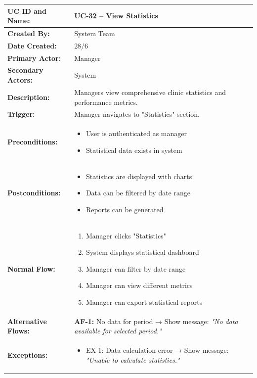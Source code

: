 \documentclass[12pt,a4paper]{article}
\begin{document}
\renewcommand{\arraystretch}{1.5}
\begin{longtable}{|p{4.5cm}|p{10.5cm}|}
\hline
\textbf{UC ID and Name:} & UC-32 – View Statistics \\
\hline
\textbf{Created By:} & System Team \\
\hline
\textbf{Date Created:} & 28/6 \\
\hline
\textbf{Primary Actor:} & Manager \\
\hline
\textbf{Secondary Actors:} & System \\
\hline
\textbf{Description:} & Managers view comprehensive clinic statistics and performance metrics. \\
\hline
\textbf{Trigger:} & Manager navigates to "Statistics" section. \\
\hline
\textbf{Preconditions:} &
\begin{itemize}
  \item User is authenticated as manager
  \item Statistical data exists in system
\end{itemize} \\
\hline
\textbf{Postconditions:} &
\begin{itemize}
  \item Statistics are displayed with charts
  \item Data can be filtered by date range
  \item Reports can be generated
\end{itemize} \\
\hline
\textbf{Normal Flow:} &
\begin{enumerate}
  \item Manager clicks "Statistics"
  \item System displays statistical dashboard
  \item Manager can filter by date range
  \item Manager can view different metrics
  \item Manager can export statistical reports
\end{enumerate} \\
\hline
\textbf{Alternative Flows:} &
\textbf{AF-1:} No data for period → Show message: \textit{"No data available for selected period."} \\
\hline
\textbf{Exceptions:} &
\begin{itemize}
  \item EX-1: Data calculation error → Show message: \textit{"Unable to calculate statistics."}
\end{itemize} \\

\end{longtable}
\end{document}
